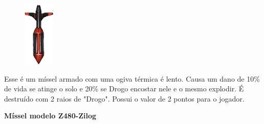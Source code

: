 \documentclass[a4paper,11pt]{article}
\begin{document}
\begin{minipage}{\textwidth}
	\begin{figure}
		\vspace{-\baselineskip}
		\includegraphics[width=0.6\linewidth]{imagens/pi-Misseis3.png} 
	\end{figure}
	Esse é um míssel armado com uma ogiva térmica é lento. Causa um dano de 10\% de vida se atinge o solo e 20\% se Drogo encostar nele e o mesmo explodir. É destruído com 2 raios de "Drogo".  Possui o valor de 2 pontos para o jogador.
	\vspace{30pt}
\end{minipage}

\textbf{Míssel modelo Z480-Zilog}
\end{document}
